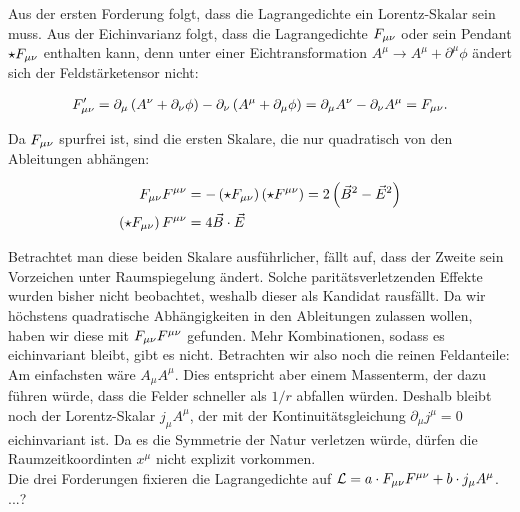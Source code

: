 Aus der ersten Forderung folgt, dass die Lagrangedichte ein Lorentz-Skalar sein muss. Aus der Eichinvarianz folgt, dass die Lagrangedichte $F_{\mu \nu}$ oder sein Pendant $\star F_{\mu \nu}$ enthalten kann, denn unter einer Eichtransformation $A^{\mu} \rightarrow A^{\mu} + \partial^{\mu} \phi$ ändert sich der Feldstärketensor nicht:

\begin{align}
F_{\mu \nu} ' = \partial_{\mu} \left( A^{\nu} + \partial_{\nu} \phi \right) - \partial_{\nu} \left( A^{\mu} + \partial_{\mu} \phi \right) = \partial_{\mu}  A^{\nu} - \partial_{\nu} A^{\mu} = F_{\mu \nu}.
\end{align}

Da $F_{\mu \nu}$ spurfrei ist, sind die ersten Skalare, die nur quadratisch von den Ableitungen abhängen:

\begin{align}
F_{\mu \nu} F^{\mu \nu} &= - \left( \star F_{\mu \nu} \right) \left( \star F^{\mu \nu} \right) = 2 \left( \vec{B}^2 - \vec{E}^2 \right) \\
\left( \star F_{\mu \nu} \right) F^{\mu \nu} &= 4 \vec{B} \cdot \vec{E}
\end{align}

Betrachtet man diese beiden Skalare ausführlicher, fällt auf, dass der Zweite sein Vorzeichen unter Raumspiegelung ändert. Solche paritätsverletzenden Effekte wurden bisher nicht beobachtet, weshalb dieser als Kandidat rausfällt. Da wir höchstens quadratische Abhängigkeiten in den Ableitungen zulassen wollen, haben wir diese mit $F_{\mu \nu} F^{\mu \nu}$ gefunden. Mehr Kombinationen, sodass es eichinvariant bleibt, gibt es nicht. Betrachten wir also noch die reinen Feldanteile: \\

Am einfachsten wäre $A_{\mu} A^{\mu}$. Dies entspricht aber einem Massenterm, der dazu führen würde, dass die Felder schneller als $1/r$ abfallen würden. Deshalb bleibt noch der Lorentz-Skalar $j_{\mu} A^{\mu}$, der mit der Kontinuitätsgleichung $\partial_{\mu} j^{\mu} = 0$ eichinvariant ist. Da es die Symmetrie der Natur verletzen würde, dürfen die Raumzeitkoordinten $x^{\mu}$ nicht explizit vorkommen. \\

Die drei Forderungen fixieren die Lagrangedichte auf $\mathcal{L} = a \cdot F_{\mu \nu} F^{\mu \nu} + b \cdot j_{\mu} A^{\mu}$. \\

...?
